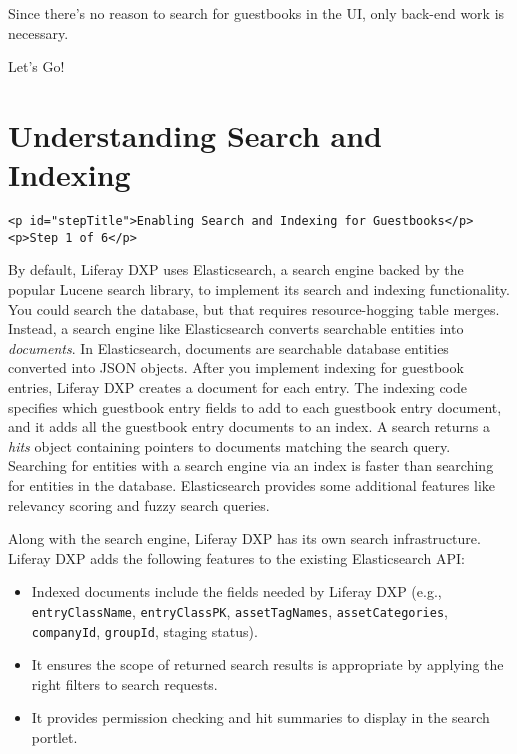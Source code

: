 Since there's no reason to search for guestbooks in the UI, only
back-end work is necessary.

Let's Go!{}

\chapter{Understanding Search and
Indexing}\label{understanding-search-and-indexing}

\begin{verbatim}
<p id="stepTitle">Enabling Search and Indexing for Guestbooks</p><p>Step 1 of 6</p>
\end{verbatim}

By default, Liferay DXP uses Elasticsearch, a search engine backed by
the popular Lucene search library, to implement its search and indexing
functionality. You could search the database, but that requires
resource-hogging table merges. Instead, a search engine like
Elasticsearch converts searchable entities into \emph{documents}. In
Elasticsearch, documents are searchable database entities converted into
JSON objects. After you implement indexing for guestbook entries,
Liferay DXP creates a document for each entry. The indexing code
specifies which guestbook entry fields to add to each guestbook entry
document, and it adds all the guestbook entry documents to an index. A
search returns a \emph{hits} object containing pointers to documents
matching the search query. Searching for entities with a search engine
via an index is faster than searching for entities in the database.
Elasticsearch provides some additional features like relevancy scoring
and fuzzy search queries.

Along with the search engine, Liferay DXP has its own search
infrastructure. Liferay DXP adds the following features to the existing
Elasticsearch API:

\begin{itemize}
\tightlist
\item
  Indexed documents include the fields needed by Liferay DXP (e.g.,
  \texttt{entryClassName}, \texttt{entryClassPK},
  \texttt{assetTagNames}, \texttt{assetCategories}, \texttt{companyId},
  \texttt{groupId}, staging status).
\item
  It ensures the scope of returned search results is appropriate by
  applying the right filters to search requests.
\item
  It provides permission checking and hit summaries to display in the
  search portlet.
\end{itemize}

